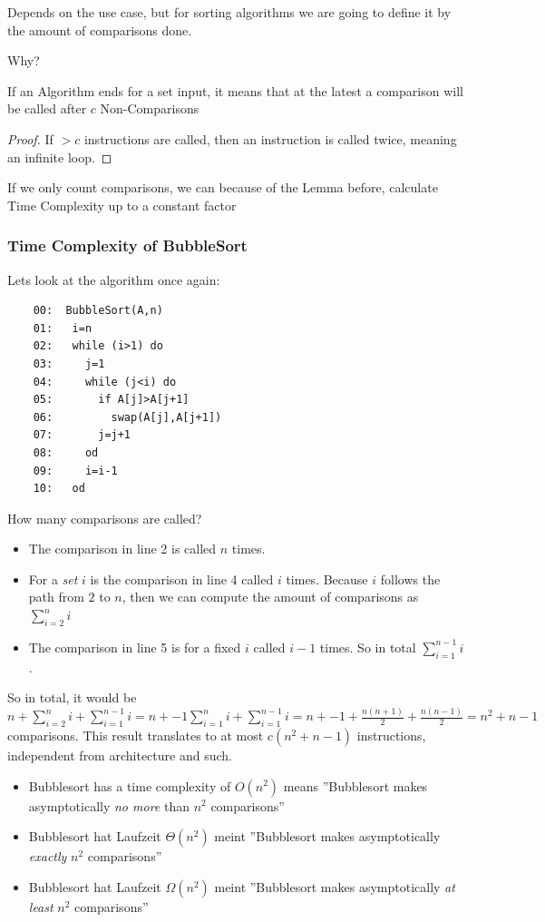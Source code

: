 Depends on the use case, but for sorting algorithms we are going to define it by the amount of comparisons done.

Why?
\begin{lem}
If an Algorithm ends for a set input, it means that at the latest a comparison will be called after $c$ Non-Comparisons
\end{lem}
\begin{proof}[Proof]
If $>c$ instructions are called, then an instruction is called twice, meaning an infinite loop. 
\end{proof}

If we only count comparisons, we can because of the Lemma before, calculate Time Complexity up to a constant factor
\subsubsection{Time Complexity of BubbleSort}
Lets look at the algorithm once again:
\begin{verbatim}
	00:  BubbleSort(A,n)
	01:   i=n
	02:   while (i>1) do
	03:     j=1
	04:     while (j<i) do
	05:       if A[j]>A[j+1]
	06:         swap(A[j],A[j+1])
	07:       j=j+1
	08:     od
	09:     i=i-1
	10:   od
\end{verbatim}

How many comparisons are called?
\begin{itemize}
\item The comparison in line 2 is called $n$ times. 
\item For a  \emph{set} $i$ is the comparison in line 4 called $i$ times. Because $i$ follows the path from $2$ to $n$, then
	we can compute the amount of comparisons as $\sum_{i=2}^{n} i$
\item The comparison in line 5 is for a fixed $i$ called $i-1$ times. So in total $\sum _{i=1}^{n-1} i$.

\end{itemize}

So in total, it would be $n+\sum_{i=2}^n i + \sum_{i=1}^{n-1}i= n+ -1 \sum_{i=1}^n i + \sum_{i=1}^{n-1}i=n+-1+\frac{n(n+1)}{2}+\frac{n(n-1)}{2}=n^2+n-1$ comparisons. This result
translates to at most $c(n^2+n-1)$ instructions, independent from architecture and such.




\begin{itemize}
\item Bubblesort has a time complexity of $O(n^2)$ means ''Bubblesort makes asymptotically \emph{no more} than $n^2$ comparisons''
\item Bubblesort hat Laufzeit $\Theta(n^2)$ meint ''Bubblesort makes asymptotically \emph{exactly} $n^2$ comparisons''
\item Bubblesort hat Laufzeit $\Omega(n^2)$ meint ''Bubblesort makes asymptotically \emph{at least} $n^2$ comparisons''
\end{itemize}

